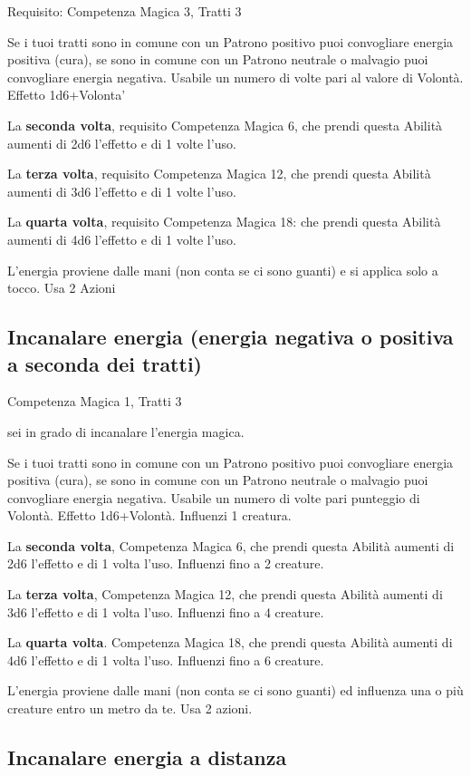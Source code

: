 \documentclass[a4paper,11pt,twoside,openany]{book}
\begin{document}
Requisito: Competenza Magica 3, Tratti 3

Se i tuoi tratti sono in comune con un Patrono positivo puoi convogliare energia positiva (cura), se sono in comune con un Patrono neutrale o malvagio puoi convogliare energia negativa. Usabile un numero di volte pari al valore di Volontà. Effetto 1d6+Volonta'

La \textbf{seconda volta}, requisito Competenza Magica 6, che prendi questa Abilità aumenti di 2d6 l'effetto e di 1 volte l'uso.

La \textbf{terza volta}, requisito Competenza Magica 12, che prendi questa Abilità aumenti di 3d6 l'effetto e di 1 volte l'uso.

La \textbf{quarta volta}, requisito Competenza Magica 18: che prendi questa Abilità aumenti di 4d6 l'effetto e di 1 volte l'uso.

L'energia proviene dalle mani (non conta se ci sono guanti) e si applica solo a tocco. Usa 2 Azioni

\subsection{Incanalare energia (energia negativa o positiva a seconda dei tratti)}

Competenza Magica 1, Tratti 3

sei in grado di incanalare l'energia magica.

Se i tuoi tratti sono in comune con un Patrono positivo puoi convogliare energia positiva (cura), se sono in comune con un Patrono neutrale o malvagio puoi convogliare energia negativa. Usabile un numero di volte pari punteggio di Volontà. Effetto 1d6+Volontà. Influenzi 1 creatura.

La \textbf{seconda volta}, Competenza Magica 6, che prendi questa Abilità aumenti di 2d6 l'effetto e di 1 volta l'uso. Influenzi fino a 2 creature.

La \textbf{terza volta}, Competenza Magica 12, che prendi questa Abilità aumenti di 3d6 l'effetto e di 1 volta l'uso. Influenzi fino a 4 creature.

La \textbf{quarta volta}. Competenza Magica 18, che prendi questa Abilità aumenti di 4d6 l'effetto e di 1 volta l'uso. Influenzi fino a 6 creature.

L'energia proviene dalle mani (non conta se ci sono guanti) ed influenza una o più creature entro un metro da te. Usa 2 azioni.

\subsection{Incanalare energia a distanza}
\end{document}
